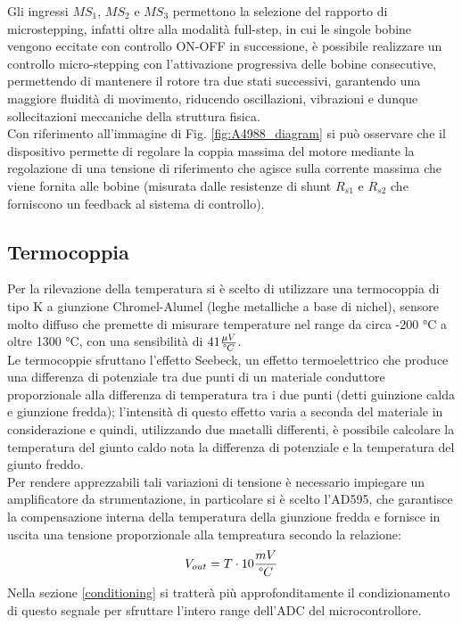 \documentclass[12pt]{article}
\begin{document}
        \noindent
        Gli ingressi $MS_1$, $MS_2$ e $MS_3$ permettono la selezione del rapporto di microstepping, infatti oltre alla modalità full-step, in cui le singole bobine vengono eccitate con controllo ON-OFF in successione, è possibile realizzare un controllo micro-stepping con l'attivazione progressiva delle bobine consecutive, permettendo di mantenere il rotore tra due stati successivi, garantendo una maggiore fluidità di movimento, riducendo oscillazioni, vibrazioni e dunque sollecitazioni meccaniche della struttura fisica.\\
        Con riferimento all'immagine di Fig. \ref{fig:A4988_diagram} si può osservare che il dispositivo permette di regolare la coppia massima del motore mediante la regolazione di una tensione di riferimento che agisce sulla corrente massima che viene fornita alle bobine (misurata dalle resistenze di shunt $R_{s1}$ e $R_{s2}$ che forniscono un feedback al sistema di controllo).

        \vspace{0.1cm}


    \subsection{Termocoppia}\label{thermocouple}
    Per la rilevazione della temperatura si è scelto di utilizzare una termocoppia di tipo K a giunzione Chromel-Alumel (leghe metalliche a base di nichel), sensore molto diffuso che premette di misurare temperature nel range da circa -200 °C a oltre 1300 °C, con una sensibilità di $41 \frac{\mu V}{\degree C}$.\\
    Le termocoppie sfruttano l'effetto Seebeck, un effetto termoelettrico che produce una differenza di potenziale tra due punti di un materiale conduttore proporzionale alla differenza di temperatura tra i due punti (detti guinzione calda e giunzione fredda); l'intensità di questo effetto varia a seconda del materiale in considerazione e quindi, utilizzando due maetalli differenti, è possibile calcolare la temperatura del giunto caldo nota la differenza di potenziale e la temperatura del giunto freddo.\\
    Per rendere apprezzabili tali variazioni di tensione è necessario impiegare un amplificatore da strumentazione, in particolare si è scelto l'AD595, che garantisce la compensazione interna della temperatura della giunzione fredda e fornisce in uscita una tensione proporzionale alla tempreatura secondo la relazione:
    \begin{equation}\label{thermocouple_relation_AD595}
        V_{out} = T \cdot 10 \frac{mV}{\degree C}
    \end{equation}
    Nella sezione \ref{conditioning} si tratterà più approfonditamente il condizionamento di questo segnale per sfruttare l'intero range dell'ADC del microcontrollore.
    
\end{document}
